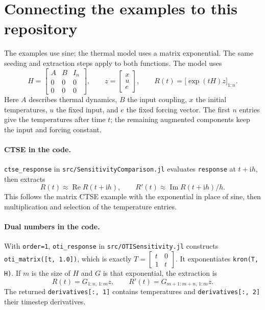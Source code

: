 \documentclass[11pt]{article}
\newcommand{\ii}{\mathrm i}
\begin{document}
\section*{Connecting the examples to this repository}
The examples use sine; the thermal model uses a matrix exponential. The same
seeding and extraction steps apply to both functions. The model uses
\[
 H=\begin{bmatrix}A&B&I_n\\0&0&0\\0&0&0\end{bmatrix},\qquad
 z=\begin{bmatrix}x\\u\\e\end{bmatrix},\qquad
 R(t)=\bigl[\exp(tH)z\bigr]_{1:n}.
\]
Here $A$ describes thermal dynamics, $B$ the input coupling, $x$ the initial
temperatures, $u$ the fixed input, and $e$ the fixed forcing vector.
The first $n$ entries give the temperatures after time $t$; the remaining
augmented components keep the input and forcing constant.

\paragraph{CTSE in the code.}
\texttt{ctse\_response} in \texttt{src/SensitivityComparison.jl} evaluates
\texttt{response} at $t+\ii h$, then extracts
\[
 R(t)\approx\operatorname{Re}R(t+\ii h),\qquad
 R'(t)\approx\operatorname{Im}R(t+\ii h)/h.
\]
This follows the matrix CTSE example with the exponential in place of sine,
then multiplication and selection of the temperature entries.

\paragraph{Dual numbers in the code.}
With \texttt{order=1}, \texttt{oti\_response} in \texttt{src/OTISensitivity.jl}
constructs \texttt{oti\_matrix([t, 1.0])}, which is exactly
$T=\left[\begin{smallmatrix}t&0\\1&t\end{smallmatrix}\right]$.
It exponentiates \texttt{kron(T, H)}. If $m$ is the size of $H$ and $G$ is
that exponential, the extraction is
\[
 R(t)=G_{1:n,\,1:m}z,\qquad
 R'(t)=G_{m+1:m+n,\,1:m}z.
\]
The returned \texttt{derivatives[:, 1]} contains temperatures and
\texttt{derivatives[:, 2]} their timestep derivatives.
\end{document}
